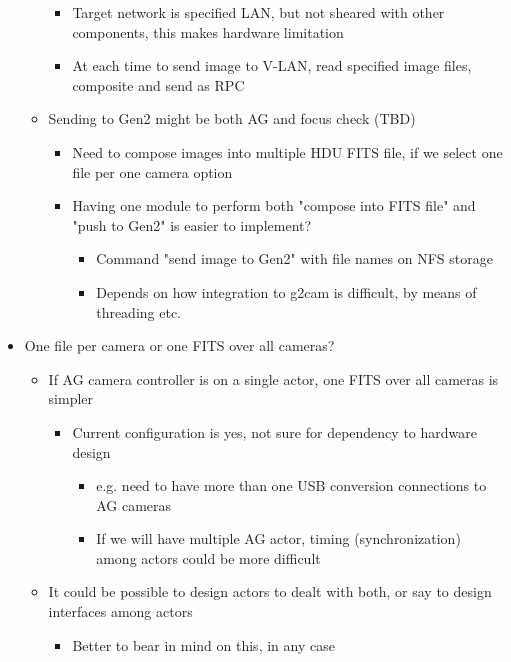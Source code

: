 \documentclass[a4paper,notitlepage]{article}
\begin{document}
\begin{itemize}
\begin{itemize}
\begin{itemize}
      \item Target network is specified LAN, but not sheared with other components, this makes hardware limitation
      \item At each time to send image to V-LAN, read specified image files, composite and send as RPC
    \end{itemize}
    \item Sending to Gen2 might be both AG and focus check (TBD)
    \begin{itemize}
      \item Need to compose images into multiple HDU FITS file, if we select one file per one camera option
      \item Having one module to perform both "compose into FITS file" and "push to Gen2" is easier to implement?
      \begin{itemize}
        \item Command "send image to Gen2" with file names on NFS storage
        \item Depends on how integration to g2cam is difficult, by means of threading etc.
      \end{itemize}
    \end{itemize}
  \end{itemize}
  \item One file per camera or one FITS over all cameras?
  \begin{itemize}
    \item If AG camera controller is on a single actor, one FITS over all cameras is simpler
    \begin{itemize}
      \item Current configuration is yes, not sure for dependency to hardware design
      \begin{itemize}
        \item e.g. need to have more than one USB conversion connections to AG cameras
        \item If we will have multiple AG actor, timing (synchronization) among actors could be more difficult
      \end{itemize}
    \end{itemize}
    \item It could be possible to design actors to dealt with both, or say to design interfaces among actors
    \begin{itemize}
      \item Better to bear in mind on this, in any case
    \end{itemize}
  \end{itemize}

\end{itemize}
\end{document}
